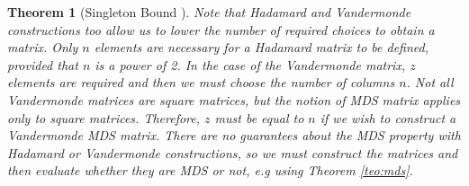\documentclass{report}
\newtheorem{theorem}{Theorem}{\bfseries}{\itshape}
\begin{document}
\begin{theorem}[Singleton Bound \cite{SloaneBook}]
Note that Hadamard and Vandermonde constructions too allow us to lower the number of required choices to obtain a matrix. Only $n$ elements are necessary for a Hadamard matrix to be defined, provided that $n$ is a power of 2. In the case of the Vandermonde matrix, $z$ elements are required and then we must choose the number of columns $n$. Not all Vandermonde matrices are square matrices, but the notion of MDS matrix applies only to square matrices. Therefore, $z$ must be equal to $n$ if we wish to construct a Vandermonde MDS matrix. There are no guarantees about the MDS property with Hadamard or Vandermonde constructions, so we must construct the matrices and then evaluate whether they are MDS or not, e.g using Theorem \ref{teo:mds}.




\end{theorem}
\end{document}

